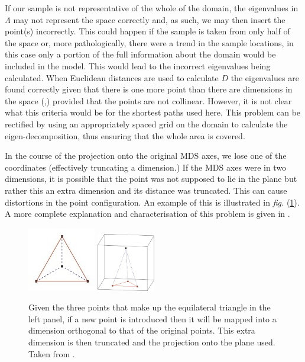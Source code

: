 \documentclass[a4paper,10pt]{article}
\newcommand{\fig}[1]{\emph{fig.} (\ref{#1})}
\begin{document}
If our sample is not representative of the whole of the domain, the eigenvalues in $\Lambda$ may not represent the space correctly and, as such, we may then insert the point(s) incorrectly. This could happen if the sample is taken from only half of the space or, more pathologically, there were a trend in the sample locations, in this case only a portion of the full information about the domain would be included in the model. This would lead to the incorrect eigenvalues being calculated. When Euclidean distances are used to calculate $D$ the eigenvalues are found correctly given that there is one more point than there are dimensions in the space (\cite{landmark},) provided that the points are not collinear. However, it is not clear what this criteria would be for the shortest paths used here. This problem can be rectified by using an appropriately spaced grid on the domain to calculate the eigen-decomposition, thus ensuring that the whole area is covered.

In the course of the projection onto the original MDS axes, we lose one of the coordinates (effectively truncating a dimension.) If the MDS axes were in two dimensions, it is possible that the point was not supposed to lie in the plane but rather this an extra dimension and its distance was truncated. This can cause distortions in the point configuration. An example of this is illustrated in \fig{bojinsert}. A more complete explanation and characterisation of this problem is given in \cite{Boj2009}. 

\begin{figure}
\centering
\includegraphics{figs/boj0.jpg} \includegraphics[width=1in]{figs/boj1.jpg} \\
\caption{Given the three points that make up the equilateral triangle in the left panel, if a new point is introduced then it will be mapped into a dimension orthogonal to that of the original points. This extra dimension is then truncated and the projection onto the plane used. Taken from \cite{Boj2009}.}
\label{bojinsert}
\end{figure}
\end{document}
